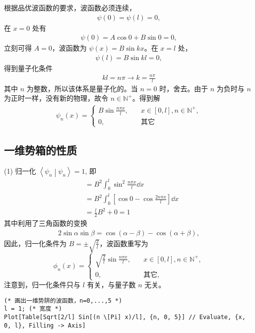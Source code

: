 根据品优波函数的要求，波函数必须连续，
\begin{eqnarray}
    \psi(0) = \psi(l) = 0,
\end{eqnarray}
在 $x=0$ 处有
\begin{eqnarray}
    \psi(0) = A \cos 0 + B \sin 0 = 0,
\end{eqnarray}
立刻可得 $A = 0$，波函数为 $\psi(x) = B \sin kx$。在 $x=l$ 处，
\begin{eqnarray}
    \psi(l) = B \sin kl = 0,
\end{eqnarray}
得到量子化条件
\begin{eqnarray}
    k l = n \pi \rightarrow k = \frac{n\pi}{l}
\end{eqnarray}
其中 $n$ 为整数，所以该体系是量子化的。当 $n=0$ 时，舍去。由于 $n$ 为负时与 $n$ 为正时一样，没有新的物理，故令 $n \in \mathbb{N}^+$。得到解
\begin{eqnarray}
    \psi_n(x) = 
    \begin{cases}
        B \sin \frac{n\pi x}l, \quad &x \in [0,l], n\in\mathbb{N}^+, \\
        0,\quad &\text{其它}
    \end{cases}
\end{eqnarray}

\subsection{一维势箱的性质}

(1) 归一化 $\left\langle \psi_n \middle | \psi _n \right\rangle = 1$, 即
\begin{align}
    &= B^2 \int_0^l \sin^2 \frac{n\pi x}{l} \dd x \\
    &=  B ^2 \int_0^l \left[\cos 0 - \cos \frac{2 n \pi x}l \right] \dd x \\
    &= \frac l2 B^2 + 0 = 1
\end{align}
其中利用了三角函数的变换
\begin{eqnarray}
    2\sin\alpha \sin\beta = \cos(\alpha-\beta) - \cos(\alpha+\beta),
\end{eqnarray}
因此，归一化条件为 $B = \pm \sqrt{\frac2l}$，波函数重写为
\begin{equation}
    \phi_n(x) = \begin{cases}\displaystyle
        \sqrt{\frac 2l} \sin\frac{n\pi x}l, \quad &x\in[0,l], n\in \mathbb{N}^+,\\
        0, \quad&\text{其它},
    \end{cases}
\end{equation}
注意到，归一化条件只与 $l$ 有关，与量子数 $n$ 无关。
\begin{lstlisting}
(* 画出一维势阱的波函数，n=0,...,5 *)
l = 1; (* 宽度 *)
Plot[Table[Sqrt[2/l] Sin[(n \[Pi] x)/l], {n, 0, 5}] // Evaluate, {x, 0, l}, Filling -> Axis]
\end{lstlisting}


